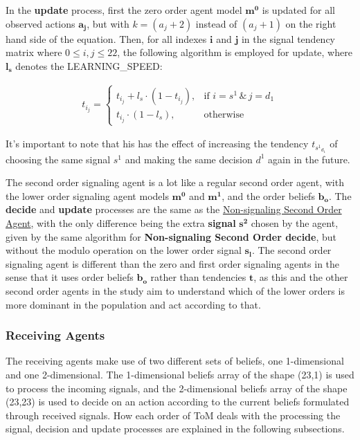 In the \textbf{update} process, first the zero order agent model $\mathbf{m^0}$ is updated for all observed actions $\mathbf{a_j}$, but with $k = (a_j + 2)$ instead of $(a_j + 1)$ on the right hand side of the equation. Then, for all indexes $\mathbf{i}$ and $\mathbf{j}$ in the signal tendency matrix where $0 \leq i, j \leq 22$, the following algorithm is employed for update, where $\mathbf{l_s}$ denotes the LEARNING\_SPEED:

\begin{equation*}
\begin{aligned}
    t_{i_j} = \begin{cases}
        t_{i_j} + l_s \cdot (1 - t_{i_j}), & \text{{if }} i = s^1 \, \& \, j = d_1 \\
        t_{i_j} \cdot (1 - l_s), & \text{{otherwise}}
    \end{cases}
\end{aligned}
\end{equation*}

It's important to note that his has the effect of increasing the tendency $t_{{s^1}_{d_1}}$ of choosing the same signal $s^1$ and making the same decision $d^1$ again in the future.


The second order signaling agent is a lot like a regular second order agent, with the lower order signaling agent models $\mathbf{m^0}$ and $\mathbf{m^1}$, and the order beliefs $\mathbf{b_o}$. The \textbf{decide} and \textbf{update} processes are the same as the \hyperref[eq:second-order-decide]{Non-signaling Second Order Agent}, with the only difference being the extra \textbf{signal} $\mathbf{s^2}$ chosen by the agent, given by the same algorithm for \textbf{Non-signaling Second Order decide}, but without the modulo operation on the lower order signal $\mathbf{s_l}$. The second order signaling agent is different than the zero and first order signaling agents in the sense that it uses order beliefs $\mathbf{b_o}$ rather than tendencies $\mathbf{t}$, as this and the other second order agents in the study aim to understand which of the lower orders is more dominant in the population and act according to that.

\subsubsection{Receiving Agents}

The receiving agents make use of two different sets of beliefs, one 1-dimensional and one 2-dimensional. The 1-dimensional beliefs array of the shape (23,1) is used to process the incoming signals, and the 2-dimensional beliefs array of the shape (23,23) is used to decide on an action according to the current beliefs formulated through received signals. How each order of ToM deals with the processing the signal, decision and update processes are explained in the following subsections.

